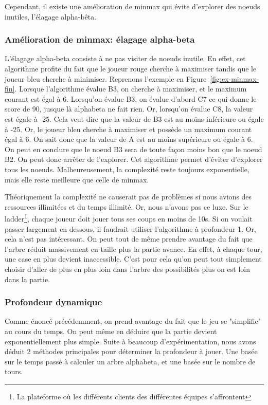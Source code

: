 Cependant, il existe une amélioration de minmax qui évite d'explorer des noeuds inutiles, l'élagage alpha-bêta.


\subsubsection{Amélioration de minmax: élagage alpha-beta}
L'élagage alpha-beta consiste à ne pas visiter de noeuds inutile. En effet, cet algorithme
profite du fait que le joueur rouge cherche à maximiser tandis que le joueur bleu cherche à minimiser.
Reprenons l'exemple en Figure~\ref{fig:ex-minmax-fin}.
Lorsque l'algorithme évalue B3, on cherche à maximiser, et le maximum courant est égal à 6.
Lorsqu'on évalue B3, on évalue d'abord C7 ce qui donne le score de 90, jusque là alphabeta ne fait rien.
Or, lorsqu'on évalue C8, la valeur est égale à -25. Cela veut-dire que la valeur de B3 est au moins
inférieure ou égale à -25. Or, le joueur bleu cherche à maximiser et possède un maximum courant égal à 6.
On sait donc que la valeur de A est au moins supérieure ou égale à 6. On peut en conclure que le noeud B3 sera de toute façon
moins bon que le noeud B2. On peut donc arrêter de l'explorer. Cet algorithme permet d'éviter d'explorer tous les noeuds. Malheureusement, la complexité
reste toujours exponentielle, mais elle reste meilleure que celle de minmax.

Théoriquement la complexité ne causerait pas de problèmes si nous avions
des ressources illimitées et du temps illimité. Or, nous n'avons pas ce luxe.
Sur le ladder\footnote{La plateforme où les différents clients des différentes équipes s'affrontent},
chaque joueur doit jouer tous ses coups en moins de 10s. Si on voulait passer largement
en dessous, il faudrait utiliser l'algorithme à profondeur 1. Or, cela n'est pas intéressant.
On peut tout de même prendre avantage du fait que l'arbre réduit massivement en taille plus la partie avance.
En effet, à chaque tour, une case en plus devient inaccessible. C'est pour cela
qu'on peut tout simplement choisir d'aller de plus en plus loin dans l'arbre des possibilités plus on
est loin dans la partie.

\subsubsection{Profondeur dynamique}
Comme énoncé précédemment, on prend avantage du fait que le jeu
se "simplifie" au cours du temps. On peut même en déduire que la partie
devient exponentiellement plus simple. Suite à beaucoup d'expérimentation,
nous avons déduit 2 méthodes principales pour déterminer la profondeur à jouer.
Une basée sur le temps passé à calculer un arbre alphabeta, et une basée
sur le nombre de tours.

